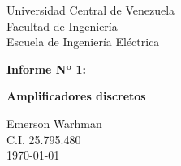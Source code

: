 \begin{titlepage}
    \centering
    \Large
    Universidad Central de Venezuela\\
    Facultad de Ingeniería\\
    Escuela de Ingeniería Eléctrica
    \vspace*{8cm}

    \Huge
    \textbf{Informe Nº 1:} 

    \textbf{Amplificadores discretos}
    \vfill


    \Large

    Emerson Warhman \\
    C.I. 25.795.480 \\
    \today

\end{titlepage}